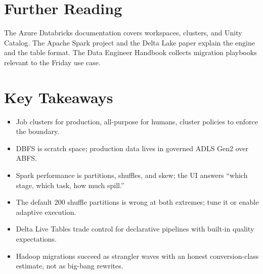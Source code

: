 \section{Further Reading}
The Azure Databricks documentation \cite{microsoft2025databricks} covers workspaces, clusters, and Unity Catalog. The Apache Spark project \cite{apache2025spark} and the Delta Lake paper \cite{armbrust2020delta} explain the engine and the table format. The Data Engineer Handbook \cite{dataexpert2025handbook} collects migration playbooks relevant to the Friday use case.

\section*{Key Takeaways}
\begin{itemize}
    \item Job clusters for production, all-purpose for humans, cluster policies to enforce the boundary.
    \item DBFS is scratch space; production data lives in governed ADLS Gen2 over ABFS.
    \item Spark performance is partitions, shuffles, and skew; the UI answers ``which stage, which task, how much spill.''
    \item The default 200 shuffle partitions is wrong at both extremes; tune it or enable adaptive execution.
    \item Delta Live Tables trade control for declarative pipelines with built-in quality expectations.
    \item Hadoop migrations succeed as strangler waves with an honest conversion-class estimate, not as big-bang rewrites.
\end{itemize}

